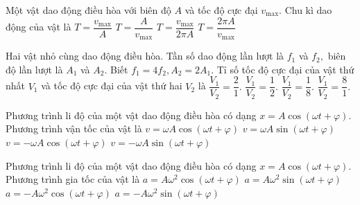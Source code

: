 \begin{ex}
	Một vật dao động điều hòa với biên độ $A$ và tốc độ cực đại $v_{\max}$. Chu kì dao động của vật là
	\choice
	{$T=\dfrac{v_{\max}}{A}$}
	{$T=\dfrac{A}{v_{\max}}$}
	{$T=\dfrac{v_{\max}}{2\pi A}$}
	{\True $T=\dfrac{2\pi A}{v_{\max}}$}
\end{ex}

\begin{ex}
	Hai vật nhỏ cùng dao động điều hòa. Tần số dao động lần lượt là ${{f}_{1}}$ và ${{f}_{2}},$ biên độ lần lượt là ${{A}_{1}}$ và ${{A}_{2}}.$ Biết ${{f}_{1}}=4{{f}_{2}},{{A}_{2}}=\text{2}{{A}_{1}}.$ Tỉ số tốc độ cực đại của vật thứ nhất ${{V}_{1}}$ và tốc độ cực đại của vật thứ hai ${{V}_{2}}$ là
	\choice
	{\True $\dfrac{{{V}_{1}}}{{{V}_{2}}}=\dfrac{2}{1}.$}
	{$\dfrac{{{V}_{1}}}{{{V}_{2}}}=\dfrac{1}{2}.$}
	{$\dfrac{{{V}_{1}}}{{{V}_{2}}}=\dfrac{1}{8}.$}
	{$\dfrac{{{V}_{1}}}{{{V}_{2}}}=\dfrac{8}{1}.$}
\end{ex}

\begin{ex}
	Phương trình li độ của một vật dao động điều hòa có dạng $x=A\cos(\omega t+\varphi)$. Phương trình vận tốc của vật là
	\choice
	{$v=\omega A\cos(\omega t+\varphi)$}
	{$v=\omega A\sin(\omega t+\varphi)$}
	{$v=-\omega A\cos(\omega t+\varphi)$}
	{\True $v=-\omega A\sin(\omega t+\varphi)$}
\end{ex}

\begin{ex}
	Phương trình li độ của một vật dao động điều hòa có dạng $x=A\cos(\omega t+\varphi)$. Phương trình gia tốc của vật là
	\choice
	{$a=A\omega^2\cos(\omega t+\varphi)$}
	{$a=A\omega^2\sin(\omega t+\varphi)$}
	{\True $a=-A\omega^2\cos(\omega t+\varphi)$}
	{$a=-A\omega^2\sin(\omega t+\varphi)$}
\end{ex}

